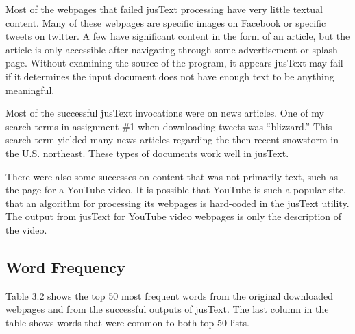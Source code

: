 \documentclass[a4paper,12pt]{article}
\begin{document}
Most of the webpages that failed jusText processing have very little textual content. Many of these webpages
are specific images on Facebook or specific tweets on twitter. A few have significant content in the form of an
article, but the article is only accessible after navigating through some advertisement or splash page. Without
examining the source of the program, it appears jusText may fail if it determines the input document does not
have enough text to be anything meaningful.

Most of the successful jusText invocations were on news articles. One of my search terms in assignment \#1 when
downloading tweets was ``blizzard.'' This search term yielded many news articles regarding the then-recent
snowstorm in the U.S. northeast. These types of documents work well in jusText.

There were also some successes on content that was not primarily text, such as the page for a YouTube video. It
is possible that YouTube is such a popular site, that an algorithm for processing its webpages is hard-coded in
the jusText utility. The output from jusText for YouTube video webpages is only the description of the video.

\subsection{Word Frequency}
Table 3.2 shows the top 50 most frequent words from the original downloaded webpages and from the successful
outputs of jusText. The last column in the table shows words that were common to both top 50 lists.
\end{document}
